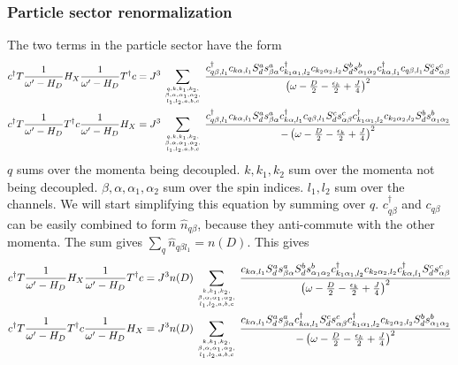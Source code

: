 \documentclass[12pt]{revtex4-2}
\begin{document}
\subsubsection*{\textbf{Particle sector renormalization}}
The two terms in the particle sector have the form
\begin{align}
	c^\dagger T \frac{1}{\omega^\prime - H_D} H_X \frac{1}{\omega^\prime - H_D} T^\dagger c = J^3\sum_{q, k, k_1,k_2,\atop{\beta, \alpha, \alpha_1,\alpha_2,\atop{l_1,l_2,a,b,c}}} \frac{c^\dagger_{q\beta,l_1} c_{k\alpha,l_1} S_d^a s^a_{\beta \alpha} c^\dagger_{k_1\alpha_1,l_2}c_{k_2 \alpha_2,l_2} S_d^b s^b_{\alpha_1 \alpha_2} c^\dagger_{k\alpha, l_1} c_{q\beta, l_1} S_d^c s^c_{\alpha \beta}}{\left(\omega - \frac{D}{2} - \frac{\epsilon_k}{2} + \frac{J}{4}\right)^2}\\
	c^\dagger T \frac{1}{\omega^\prime - H_D} T^\dagger c \frac{1}{\omega^\prime - H_D} H_X = J^3\sum_{q, k, k_1,k_2,\atop{\beta, \alpha, \alpha_1,\alpha_2,\atop{l_1,l_2,a,b,c}}} \frac{c^\dagger_{q\beta,l_1} c_{k\alpha,l_1} S_d^a s^a_{\beta \alpha} c^\dagger_{k\alpha, l_1} c_{q\beta, l_1} S_d^c s^c_{\alpha \beta} c^\dagger_{k_1\alpha_1,l_2}c_{k_2 \alpha_2,l_2} S_d^b s^b_{\alpha_1 \alpha_2}}{-\left(\omega - \frac{D}{2} - \frac{\epsilon_k}{2} + \frac{J}{4}\right)^2}
\end{align}
\(q\) sums over the momenta being decoupled. \(k, k_1,k_2\) sum over the momenta not being decoupled. \(\beta, \alpha, \alpha_1,\alpha_2\) sum over the spin indices. \(l_1,l_2\) sum over the channels. We will start simplifying this equation by summing over \(q\). \(c^\dagger_{q\beta}\) and \(c_{q\beta}\) can be easily combined to form \(\hat n_{q\beta}\), because they anti-commute with the other momenta. The sum gives \(\sum_q \hat n_{q\beta l_1} = n(D) \). This gives
\begin{align}
	c^\dagger T \frac{1}{\omega^\prime - H_D} H_X \frac{1}{\omega^\prime - H_D} T^\dagger c = J^3 n(D)\sum_{k, k_1,k_2,\atop{\beta, \alpha, \alpha_1,\alpha_2,\atop{l_1,l_2,a,b,c}}} \frac{c_{k\alpha,l_1} S_d^a s^a_{\beta \alpha} S_d^b s^b_{\alpha_1 \alpha_2} c^\dagger_{k_1\alpha_1,l_2}c_{k_2 \alpha_2,l_2} c^\dagger_{k\alpha, l_1} S_d^c s^c_{\alpha \beta}}{\left(\omega - \frac{D}{2} - \frac{\epsilon_k}{2} + \frac{J}{4}\right)^2}\\
	c^\dagger T \frac{1}{\omega^\prime - H_D} T^\dagger c \frac{1}{\omega^\prime - H_D} H_X = J^3 n(D) \sum_{k, k_1,k_2,\atop{\beta, \alpha, \alpha_1,\alpha_2,\atop{l_1,l_2,a,b,c}}} \frac{c_{k\alpha,l_1} S_d^a s^a_{\beta \alpha} c^\dagger_{k\alpha, l_1} S_d^c s^c_{\alpha \beta} c^\dagger_{k_1\alpha_1,l_2}c_{k_2 \alpha_2,l_2} S_d^b s^b_{\alpha_1 \alpha_2}}{-\left(\omega - \frac{D}{2} - \frac{\epsilon_k}{2} + \frac{J}{4}\right)^2}
\end{align}
\end{document}
